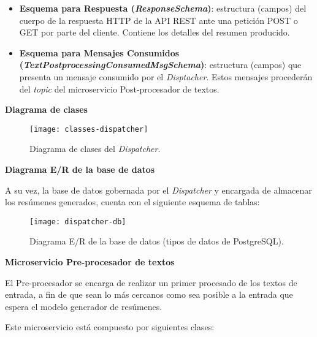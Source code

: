 \begin{itemize} [\textbullet]
	\item \textbf{Esquema para Respuesta (\emph{ResponseSchema})}: estructura (campos) del cuerpo de la respuesta HTTP de la API REST ante una petición POST o GET por parte del cliente. Contiene los detalles del resumen producido.
	
	\item \textbf{Esquema para Mensajes Consumidos \\ (\emph{TextPostprocessingConsumedMsgSchema})}: estructura (campos) que presenta un mensaje consumido por el \emph{Disptacher}. Estos mensajes procederán del \emph{topic} del microservicio Post-procesador de textos.
\end{itemize}

\noindent
\textbf{Diagrama de clases}

\begin{figure}[h]
	\centering
	\texttt{[image: classes-dispatcher]}
	\vspace{-0.5cm}
	\caption{Diagrama de clases del \emph{Dispatcher}.}
\end{figure}

\newpage

\noindent
\textbf{Diagrama E/R de la base de datos}

A su vez, la base de datos gobernada por el \emph{Dispatcher} y encargada de almacenar los resúmenes generados, cuenta con el siguiente esquema de tablas:

\smallskip

\begin{figure}[h!]
	\centering
	\texttt{[image: dispatcher-db]}
	\vspace{-0.5cm}
	\caption{Diagrama E/R de la base de datos (tipos de datos de PostgreSQL).}
\end{figure}

\newpage

\noindent
\textbf{\large Microservicio Pre-procesador de textos}

El Pre-procesador se encarga de realizar un primer procesado de los textos de entrada, a fin de que sean lo más cercanos como sea posible a la entrada que espera el modelo generador de resúmenes.

Este microservicio está compuesto por siguientes clases:

